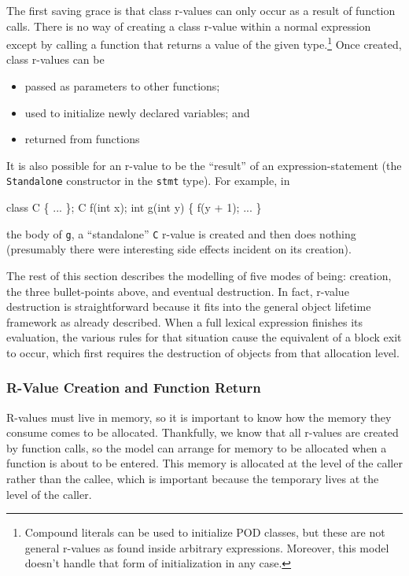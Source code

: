 \documentclass[11pt]{article}
\begin{document}
The first saving grace is that class r-values can only occur as a
result of function calls.  There is no way of creating a class r-value
within a normal expression except by calling a function that returns a
value of the given type.\footnote{Compound literals can be used to
  initialize POD classes, but these are not general r-values as found
  inside arbitrary expressions.  Moreover, this model doesn't handle
  that form of initialization in any case.}  Once created, class
r-values can be
\begin{itemize}
\item passed as parameters to other functions;
\item used to initialize newly declared variables; and
\item returned from functions
\end{itemize}
It is also possible for an r-value to be the ``result'' of an
expression-statement (the \texttt{Standalone} constructor in the
\texttt{stmt} type).  For example, in
\begin{stdrule}
   class C \{ ... \};
   C f(int x);
   int g(int y) \{ f(y + 1); ... \}
\end{stdrule}
the body of \texttt{g}, a ``standalone'' \texttt{C} r-value is created
and then does nothing (presumably there were interesting side effects
incident on its creation).

The rest of this section describes the modelling of five modes of being:
creation, the three bullet-points above, and eventual destruction.  In
fact, r-value destruction is straightforward because it fits into the
general object lifetime framework as already described.  When a full
lexical expression finishes its evaluation, the various rules for that
situation cause the equivalent of a block exit to occur, which first
requires the destruction of objects from that allocation level.

\subsubsection{R-Value Creation and Function Return}
\label{sec:r-value-creation}

R-values must live in memory, so it is important to know how the
memory they consume comes to be allocated.  Thankfully, we know that
all r-values are created by function calls, so the model can arrange
for memory to be allocated when a function is about to be entered.
This memory is allocated at the level of the caller rather than the
callee, which is important because the temporary lives at the level of
the caller.
\end{document}

